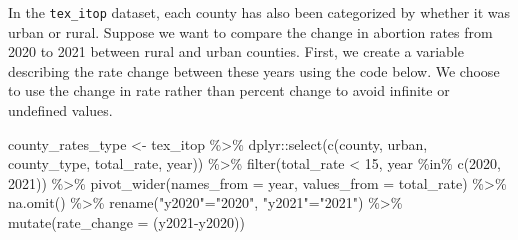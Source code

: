 \documentclass[
  letterpaper,
]{krantz}
\makeatletter
\newenvironment{Shaded}{\begin{snugshade}}{\end{snugshade}}
\newcommand{\AttributeTok}[1]{\textcolor[rgb]{0.40,0.45,0.13}{#1}}
\newcommand{\CommentTok}[1]{\textcolor[rgb]{0.37,0.37,0.37}{#1}}
\newcommand{\DecValTok}[1]{\textcolor[rgb]{0.68,0.00,0.00}{#1}}
\newcommand{\FunctionTok}[1]{\textcolor[rgb]{0.28,0.35,0.67}{#1}}
\newcommand{\NormalTok}[1]{\textcolor[rgb]{0.00,0.23,0.31}{#1}}
\newcommand{\OtherTok}[1]{\textcolor[rgb]{0.00,0.23,0.31}{#1}}
\newcommand{\SpecialCharTok}[1]{\textcolor[rgb]{0.37,0.37,0.37}{#1}}
\newcommand{\StringTok}[1]{\textcolor[rgb]{0.13,0.47,0.30}{#1}}
\newenvironment{kframe}{%
\medskip{}
\setlength{\fboxsep}{.8em}
 \def\at@end@of@kframe{}%
 \ifinner\ifhmode%
  \def\at@end@of@kframe{\end{minipage}}%
  \begin{minipage}{\columnwidth}%
 \fi\fi%
 \def\FrameCommand##1{\hskip\@totalleftmargin \hskip-\fboxsep
 \colorbox{shadecolor}{##1}\hskip-\fboxsep
     \hskip-\linewidth \hskip-\@totalleftmargin \hskip\columnwidth}%
 \MakeFramed {\advance\hsize-\width
   \@totalleftmargin\z@ \linewidth\hsize
   \@setminipage}}%
 {\par\unskip\endMakeFramed%
 \at@end@of@kframe}
\renewenvironment{Shaded}{\begin{kframe}}{\end{kframe}}
\makeatother
\begin{document}
\begin{Shaded}
\end{Shaded}

In the \texttt{tex\_itop} dataset, each county has also been categorized
by whether it was urban or rural. Suppose we want to compare the change
in abortion rates from 2020 to 2021 between rural and urban counties.
First, we create a variable describing the rate change between these
years using the code below. We choose to use the change in rate rather
than percent change to avoid infinite or undefined values.

\begin{Shaded}
\begin{Highlighting}[]
\NormalTok{county\_rates\_type }\OtherTok{\textless{}{-}}\NormalTok{ tex\_itop }\SpecialCharTok{\%\textgreater{}\%}
\NormalTok{  dplyr}\SpecialCharTok{::}\FunctionTok{select}\NormalTok{(}\FunctionTok{c}\NormalTok{(county, urban, county\_type, total\_rate, year)) }\SpecialCharTok{\%\textgreater{}\%}
  \FunctionTok{filter}\NormalTok{(total\_rate }\SpecialCharTok{\textless{}} \DecValTok{15}\NormalTok{, year }\SpecialCharTok{\%in\%} \FunctionTok{c}\NormalTok{(}\DecValTok{2020}\NormalTok{, }\DecValTok{2021}\NormalTok{)) }\SpecialCharTok{\%\textgreater{}\%}
  \FunctionTok{pivot\_wider}\NormalTok{(}\AttributeTok{names\_from =}\NormalTok{ year, }\AttributeTok{values\_from =}\NormalTok{ total\_rate) }\SpecialCharTok{\%\textgreater{}\%}
  \FunctionTok{na.omit}\NormalTok{() }\SpecialCharTok{\%\textgreater{}\%}
  \FunctionTok{rename}\NormalTok{(}\StringTok{"y2020"}\OtherTok{=}\StringTok{"2020"}\NormalTok{, }\StringTok{"y2021"}\OtherTok{=}\StringTok{"2021"}\NormalTok{) }\SpecialCharTok{\%\textgreater{}\%}
  \FunctionTok{mutate}\NormalTok{(}\AttributeTok{rate\_change =}\NormalTok{ (y2021}\SpecialCharTok{{-}}\NormalTok{y2020)) }
\end{Highlighting}
\end{Shaded}
\end{document}
